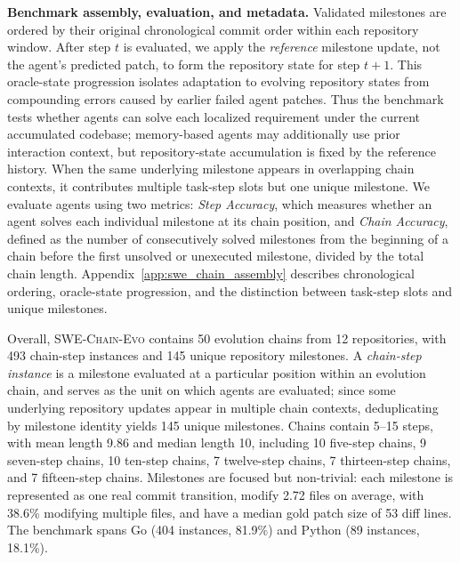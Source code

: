 \documentclass{article}
\begin{document}
\textbf{Benchmark assembly, evaluation, and metadata.} \noindent
Validated milestones are ordered by their original chronological commit order within each repository window. After step $t$ is evaluated, we apply the \emph{reference} milestone update, not the agent's predicted patch, to form the repository state for step $t+1$. This oracle-state progression isolates adaptation to evolving repository states from compounding errors caused by earlier failed agent patches. 
Thus the benchmark tests whether agents can solve each localized requirement under the current accumulated codebase; memory-based agents may additionally use prior interaction context, but repository-state accumulation is fixed by the reference history.
When the same underlying milestone appears in overlapping chain contexts, it contributes multiple task-step slots but one unique milestone. 
We evaluate agents using two metrics: \emph{Step Accuracy}, which measures whether an agent solves each individual milestone at its chain position, and \emph{Chain Accuracy}, defined as the number of consecutively solved milestones from the beginning of a chain before the first unsolved or unexecuted milestone, divided by the total chain length.
Appendix~\ref{app:swe_chain_assembly} describes chronological ordering, oracle-state progression, and the distinction between task-step slots and unique milestones.



Overall, \textsc{SWE-Chain-Evo} contains 50 evolution chains from 12 repositories, with 493 chain-step instances and 145 unique repository milestones. A
\emph{chain-step instance} is a milestone evaluated at a particular position within an evolution chain, and serves as the unit on which agents are evaluated;
since some underlying repository updates appear in multiple chain contexts, deduplicating by milestone identity yields 145 unique milestones. Chains contain
5--15 steps, with mean length 9.86 and median length 10, including 10 five-step chains, 9 seven-step chains, 10 ten-step chains, 7 twelve-step chains, 7
thirteen-step chains, and 7 fifteen-step chains. Milestones are focused but non-trivial: each milestone is represented as one real commit transition, modify 2.72
files on average, with 38.6\% modifying multiple files, and have a median gold patch size of 53 diff lines. The benchmark spans Go (404 instances, 81.9\%) and
Python (89 instances, 18.1\%).
\end{document}
